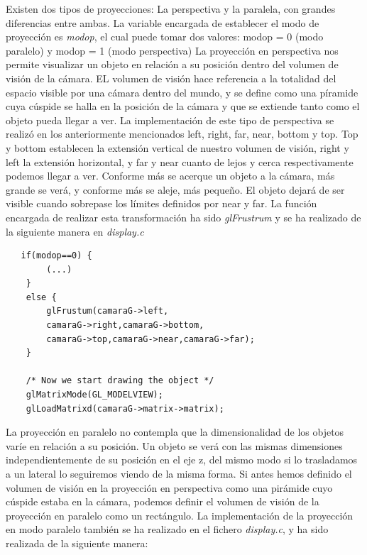 \documentclass[12pt,a4paper]{article}
\begin{document}
\begin{enumerate}
\begin{enumerate}
Existen dos tipos de proyecciones: La perspectiva y la paralela, con grandes diferencias entre ambas. La variable encargada de establecer el modo de proyección es \textit{modop}, el cual puede tomar dos valores: modop = 0 (modo paralelo) y modop = 1 (modo perspectiva) \newline
La proyección en perspectiva nos permite visualizar un objeto en relación a su posición dentro del volumen de visión de la cámara. EL volumen de visión hace referencia a la totalidad del espacio visible por una cámara dentro del mundo, y se define como una píramide cuya cúspide se halla en la posición de la cámara y que se extiende tanto como el objeto pueda llegar a ver. La implementación de este tipo de perspectiva se realizó en los anteriormente mencionados left, right, far, near, bottom y top.\newline
Top y bottom establecen la extensión vertical de nuestro volumen de visión, right y left la extensión horizontal, y far y near cuanto de lejos y cerca respectivamente podemos llegar a ver.  Conforme más se acerque un objeto a la cámara, más grande se verá, y conforme más se aleje, más pequeño. El objeto dejará de ser visible cuando sobrepase los límites definidos por near y far. La función encargada de realizar esta transformación ha sido \textit{glFrustrum} y se ha realizado de la siguiente manera en \textit{display.c}
\begin{lstlisting}
   if(modop==0) {
		(...)
    }
    else {
        glFrustum(camaraG->left,
        camaraG->right,camaraG->bottom,
        camaraG->top,camaraG->near,camaraG->far);
    }

    /* Now we start drawing the object */
    glMatrixMode(GL_MODELVIEW);
    glLoadMatrixd(camaraG->matrix->matrix);
\end{lstlisting}

\newliine
La proyección en paralelo no contempla que la dimensionalidad de los objetos varíe en relación a su posición. Un objeto se verá con las mismas dimensiones independientemente de su posición en el eje z, del mismo modo si lo trasladamos a un lateral lo seguiremos viendo de la misma forma. Si antes hemos definido el volumen de visión en la proyección en perspectiva como una pirámide cuyo cúspide estaba en la cámara, podemos definir el volumen de visión de la proyección en paralelo como un rectángulo. La implementación de la proyección en modo paralelo también se ha realizado en el fichero \textit{display.c}, y ha sido realizada de la siguiente manera:\newline


\end{enumerate}
\end{enumerate}
\end{document}

